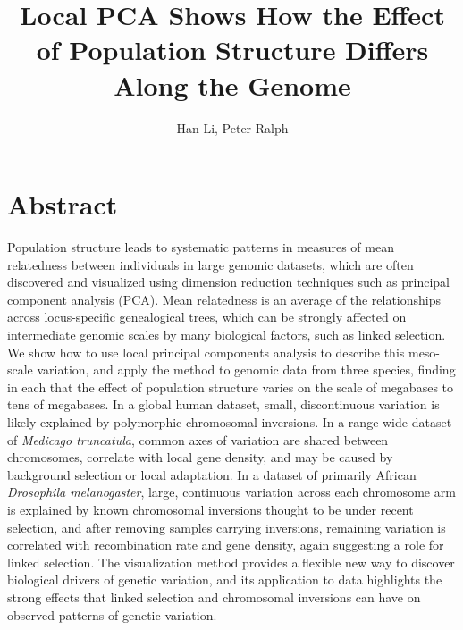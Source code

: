 \documentclass[11pt, oneside]{article}   	%
\title{Local PCA Shows How the Effect of Population Structure Differs Along the Genome}
\author{Han Li, Peter Ralph}
\begin{document}
\maketitle


\section*{Abstract}

Population structure leads to systematic patterns in measures of mean relatedness
between individuals in large genomic datasets,
which are often discovered and visualized using dimension reduction techniques such as principal component analysis (PCA).
Mean relatedness
is an average of the relationships across locus-specific genealogical trees,
which can be strongly affected on intermediate genomic scales by many biological factors,
such as linked selection.
We show how to use local principal components analysis to describe this meso-scale variation,
and apply the method to genomic data from three species,
finding in each that the effect of population structure varies on the scale of megabases to tens of megabases.
In a global human dataset, small, discontinuous variation is likely explained by polymorphic chromosomal inversions.
In a range-wide dataset of \textit{Medicago truncatula},
common axes of variation are shared between chromosomes,
correlate with local gene density,
and may be caused by background selection or local adaptation.
In a dataset of primarily African \textit{Drosophila melanogaster}, large, continuous variation across each chromosome arm
is explained by known chromosomal inversions thought to be under recent selection,
and after removing samples carrying inversions, remaining variation is correlated with recombination rate and gene density,
again suggesting a role for linked selection.
The visualization method provides a flexible new way to discover biological drivers of genetic variation,
and its application to data highlights the strong effects that linked selection and chromosomal inversions
can have on observed patterns of genetic variation.
\end{document}
